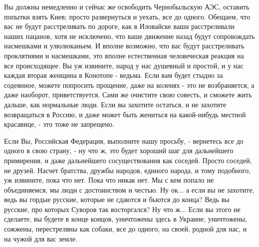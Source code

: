 Вы должны немедленно и сейчас же освободить Чернобыльскую АЭС, оставить попытки взять Киев; просто
развернуться и уехать, все до одного. Обещаем, что вас не будут расстреливать
по дороге, как в Иловайске ваши расстреливали наших пацанов, хотя не исключено,
что ваше движение назад будут сопровождать насмешками и улюлюканьем. И вполне
возможно, что вас будут расстреливать проклятиями и насмешками, это вполне
естественная человеческая реакция на все происходящее. Вы уж извините, народ у
нас душевный и простой, и у нас каждая вторая женщина в Конотопе - ведьма. Если
вам будет стыдно за содеянное, можете попросить прощение, даже на коленях - это
не возбраняется, а даже наоборот, приветствуется. Сами же очистите свою
совесть, и сможете жить дальше, как нормальные люди. Если вы захотите остаться,
и не захотите возвращаться в Россию, и даже может быть жениться на какой-нибудь
местной красавице, - это тоже не запрещено.

Если Вы, Российская Федерация, выполните нашу просьбу, - вернетесь все до
одного в свою страну, - ну что ж, это будет хороший шаг для дальнейшего
примирения, и даже дальнейшего сосуществования как соседей. Просто соседей, не
друзей. Насчет братства, дружбы народов, единого народа, и тому подобного, уж
извините, пока что нет.  Пока что никак нет. Мы с кем попало не объединяемся,
мы люди с достоинством и честью. Ну ок... а если вы не захотите, ведь вы гордые
русские, которые не сдаются и бьются до конца? Ведь вы русские, про которых
Суворов так восторгался? Ну что ж...  Если вы этого не сделаете, вы будете в
конце концов, уничтожены здесь в Украине, уничтожены, сожжены, перестреляны как
собаки, все до одного, на своей, родной для нас, и на чужой для вас земле.
